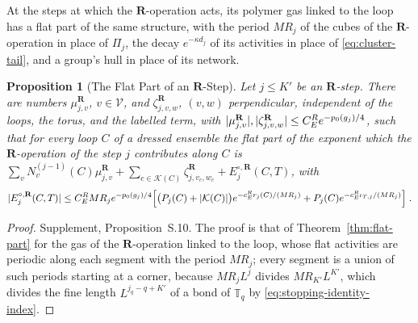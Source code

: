 \documentclass[11pt]{preprint}
\DeclarePairedDelimiter{\abs}{\lvert}{\rvert}
\numberwithin{equation}{section}
\newtheorem{proposition}[theorem]{Proposition}
\theoremstyle{definition}
\theoremstyle{remark}
\theoremstyle{plain}
\begin{document}
At the steps at which the $\mathbf R$-operation acts, its polymer gas linked to the loop has a flat part of the same structure, with the period $MR_j$ of the cubes of the $\mathbf R$-operation in place of $\Pi_{j}$, the decay $e^{-\kappa d_j}$ of its activities in place of \eqref{eq:cluster-tail}, and a group's hull in place of its network.

\begin{proposition}[The Flat Part of an $\mathbf R$-Step]\label{prop:r-flat-part}
Let $j \leq K'$ be an $\mathbf R$-step. There are numbers $\mu^{\mathbf R}_{j,v}$, $v \in \mathcal V$, and $\zeta^{\mathbf R}_{j,v,w}$, $(v, w)$ perpendicular, independent of the loops, the torus, and the labelled term, with $\abs{\mu^{\mathbf R}_{j,v}}, \abs{\zeta^{\mathbf R}_{j,v,w}} \leq C^R_Ee^{-p_0(g_j)/4}$, such that for every loop $C$ of a dressed ensemble the flat part of the exponent which the $\mathbf R$-operation of the step $j$ contributes along $C$ is $\sum_vN^{(j-1)}_v(C)\mu^{\mathbf R}_{j,v} + \sum_{c \in \mathcal K(C)}\zeta^{\mathbf R}_{j,v_c,w_c} + E^{\circ,\mathbf R}_j(C, T)$, with
\begin{equation}\label{eq:r-flat-remainder}
    \abs{E^{\circ,\mathbf R}_j(C, T)} \leq C^R_EMR_je^{-p_0(g_j)/4}\Bigl[\bigl(P_j(C) + \abs{\mathcal K(C)}\bigr)e^{-c^R_Er_j(C)/(MR_j)} + P_j(C)e^{-c^R_E\iota_{T,j}/(MR_j)}\Bigr]\;.
\end{equation}
\end{proposition}

\begin{proof}
Supplement, Proposition~S.10. The proof is that of Theorem~\ref{thm:flat-part} for the gas of the $\mathbf R$-operation linked to the loop, whose flat activities are periodic along each segment with the period $MR_j$; every segment is a union of such periods starting at a corner, because $MR_jL^j$ divides $MR_{K'}L^{K'}$, which divides the fine length $L^{j_q-q+K'}$ of a bond of $\mathbb T_q$ by \eqref{eq:stopping-identity-index}.
\end{proof}
\end{document}
